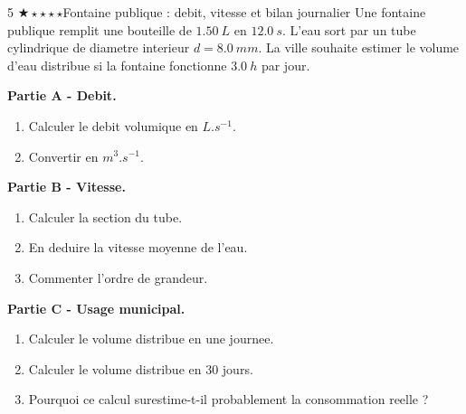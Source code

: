 \documentclass[11pt,a4paper]{article}
\newcommand{\diffone}{\(\bigstar\star\star\star\star\)}
\begin{document}
\begin{probleme}{5 \diffone}{Fontaine publique : debit, vitesse et bilan journalier}
Une fontaine publique remplit une bouteille de \(\SI{1.50}{L}\) en \(\SI{12.0}{s}\). L'eau sort par un tube cylindrique de diametre interieur \(d=\SI{8.0}{mm}\). La ville souhaite estimer le volume d'eau distribue si la fontaine fonctionne \(\SI{3.0}{h}\) par jour.

\textbf{Partie A - Debit.}
\begin{enumerate}
\item Calculer le debit volumique en \(\si{L.s^{-1}}\).
\item Convertir en \(\si{m^3.s^{-1}}\).
\end{enumerate}

\textbf{Partie B - Vitesse.}
\begin{enumerate}[resume]
\item Calculer la section du tube.
\item En deduire la vitesse moyenne de l'eau.
\item Commenter l'ordre de grandeur.
\end{enumerate}

\textbf{Partie C - Usage municipal.}
\begin{enumerate}[resume]
\item Calculer le volume distribue en une journee.
\item Calculer le volume distribue en \(30\) jours.
\item Pourquoi ce calcul surestime-t-il probablement la consommation reelle ?
\end{enumerate}
\end{probleme}
\end{document}
